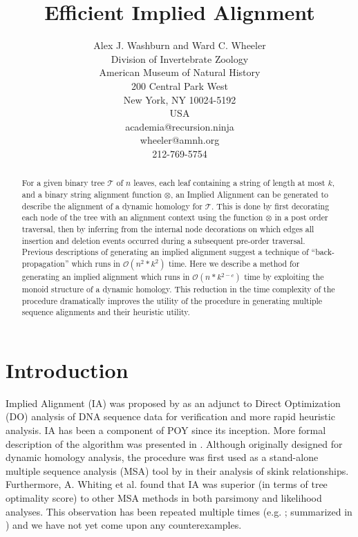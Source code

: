 \documentclass[11pt]{article}
\title{ \textbf{Efficient Implied Alignment}}
\author{Alex J. Washburn and Ward C. Wheeler\\
		Division of  Invertebrate Zoology\\
		American Museum of Natural History\\
		200 Central Park West\\
		New York, NY 10024-5192\\
		USA\\
		academia@recursion.ninja\\
		wheeler@amnh.org\\
		212-769-5754}
\begin{document}
\maketitle
\begin{abstract}
  For a given binary tree $\mathcal{T}$ of $n$ leaves, each leaf containing a string of length at most $k$, and a binary string alignment function $\otimes$, an Implied Alignment \citep{Wheeler2003} can be generated to describe the alignment of a dynamic homology for $\mathcal{T}$. This is done by first decorating each node of the tree with an alignment context using the function $\otimes$ in a post order traversal, then by inferring from the internal node decorations on which edges all insertion and deletion events occurred during a subsequent pre-order traversal. Previous descriptions of generating an implied alignment suggest a technique of ``back-propagation'' which runs in $\mathcal{O}(n^2 * k^2)$ time. Here we describe a method for generating an implied alignment which runs in \textsc{$\mathcal{O}(n * k^{2-c})$} time by exploiting the monoid structure of a dynamic homology. This reduction in the time complexity of the procedure dramatically improves the utility of the procedure in generating multiple sequence alignments and their heuristic utility.
\end{abstract}
\newpage
\tableofcontents
\newpage

\section{Introduction}
Implied Alignment (IA) was proposed by \cite{Wheeler2003} as an adjunct to Direct Optimization (DO) \citep{Wheeler1996,VaronandWheeler2012} analysis of DNA sequence data for verification and more rapid heuristic analysis.
IA has been a component of POY \citep{Wheeleretal2015, POY5} since its inception.
More formal description of the algorithm was presented in \cite{Wheeleretal2006}.
Although originally designed for dynamic homology \citep{Wheeler2001} analysis, the procedure was first used as a stand-alone multiple sequence analysis (MSA) tool by \cite{WhitingAetal2006} in their analysis of skink relationships.  Furthermore, A. Whiting et al. found that IA was superior (in terms of tree optimality score) to other MSA methods in both parsimony and likelihood analyses.  
This observation has been repeated multiple times (e.g. \citealp{LindgrenandDaly2007, FordandWheeler2015}; summarized in \citealp{Wheeler2012}) and we have not yet come upon any counterexamples.    
\end{document}
